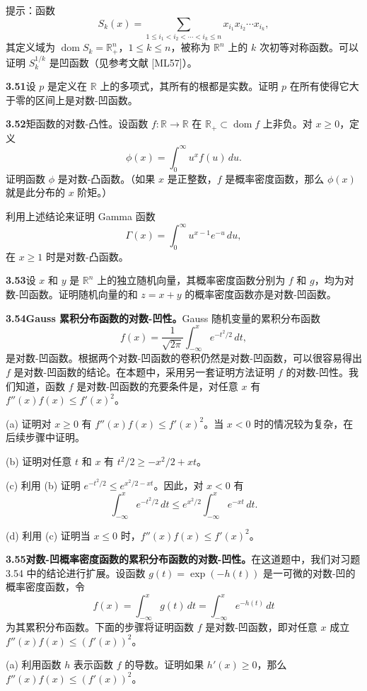 \documentclass[UTF8,12pt,a4paper,fontset=fandol]{ctexart}
\DeclareMathOperator{\dom}{dom}
\begin{document}
提示：函数
\[
S_k(x)=\sum_{1\leq i_1<i_2<\cdots<i_k\leq n}x_{i_1}x_{i_2}\cdots x_{i_k},
\]
其定义域为 $\dom S_k=\mathbb{R}_+^n$，$1\leq k\leq n$，被称为 $\mathbb{R}^n$ 上的 $k$ 次初等对称函数。可以证明 $S_k^{1/k}$ 是凹函数（见参考文献 [ML57]）。

\noindent\textbf{3.51}\quad [BL00，第 41 页] 设 $p$ 是定义在 $\mathbb{R}$ 上的多项式，其所有的根都是实数。证明 $p$ 在所有使得它大于零的区间上是对数-凹函数。

\noindent\textbf{3.52}\quad [MO79，\S3.E.2] 矩函数的对数-凸性。设函数 $f:\mathbb{R}\to\mathbb{R}$ 在 $\mathbb{R}_+\subset\dom f$ 上非负。对 $x\geq0$，定义
\[
\phi(x)=\int_0^\infty u^x f(u)\,du.
\]
证明函数 $\phi$ 是对数-凸函数。（如果 $x$ 是正整数，$f$ 是概率密度函数，那么 $\phi(x)$ 就是此分布的 $x$ 阶矩。）

利用上述结论来证明 Gamma 函数
\[
\Gamma(x)=\int_0^\infty u^{x-1}e^{-u}\,du,
\]
在 $x\geq1$ 时是对数-凸函数。

\noindent\textbf{3.53}\quad 设 $x$ 和 $y$ 是 $\mathbb{R}^n$ 上的独立随机向量，其概率密度函数分别为 $f$ 和 $g$，均为对数-凹函数。证明随机向量的和 $z=x+y$ 的概率密度函数亦是对数-凹函数。

\noindent\textbf{3.54\quad Gauss 累积分布函数的对数-凹性。}\quad Gauss 随机变量的累积分布函数
\[
f(x)=\frac{1}{\sqrt{2\pi}}\int_{-\infty}^x e^{-t^2/2}\,dt,
\]
是对数-凹函数。根据两个对数-凹函数的卷积仍然是对数-凹函数，可以很容易得出 $f$ 是对数-凹函数的结论。在本题中，采用另一套证明方法证明 $f$ 的对数-凹性。我们知道，函数 $f$ 是对数-凹函数的充要条件是，对任意 $x$ 有 $f''(x)f(x)\leq f'(x)^2$。

(a) 证明对 $x\geq0$ 有 $f''(x)f(x)\leq f'(x)^2$。当 $x<0$ 时的情况较为复杂，在后续步骤中证明。

(b) 证明对任意 $t$ 和 $x$ 有 $t^2/2\geq -x^2/2+xt$。

(c) 利用 (b) 证明 $e^{-t^2/2}\leq e^{x^2/2-xt}$。因此，对 $x<0$ 有
\[
\int_{-\infty}^x e^{-t^2/2}\,dt\leq e^{x^2/2}\int_{-\infty}^x e^{-xt}\,dt.
\]

(d) 利用 (c) 证明当 $x\leq0$ 时，$f''(x)f(x)\leq f'(x)^2$。

\noindent\textbf{3.55\quad 对数-凹概率密度函数的累积分布函数的对数-凹性。}\quad 在这道题中，我们对习题 3.54 中的结论进行扩展。设函数 $g(t)=\exp(-h(t))$ 是一可微的对数-凹的概率密度函数，令
\[
f(x)=\int_{-\infty}^x g(t)\,dt=\int_{-\infty}^x e^{-h(t)}\,dt
\]
为其累积分布函数。下面的步骤将证明函数 $f$ 是对数-凹函数，即对任意 $x$ 成立 $f''(x)f(x)\leq(f'(x))^2$。

(a) 利用函数 $h$ 表示函数 $f$ 的导数。证明如果 $h'(x)\geq0$，那么 $f''(x)f(x)\leq(f'(x))^2$。
\end{document}
